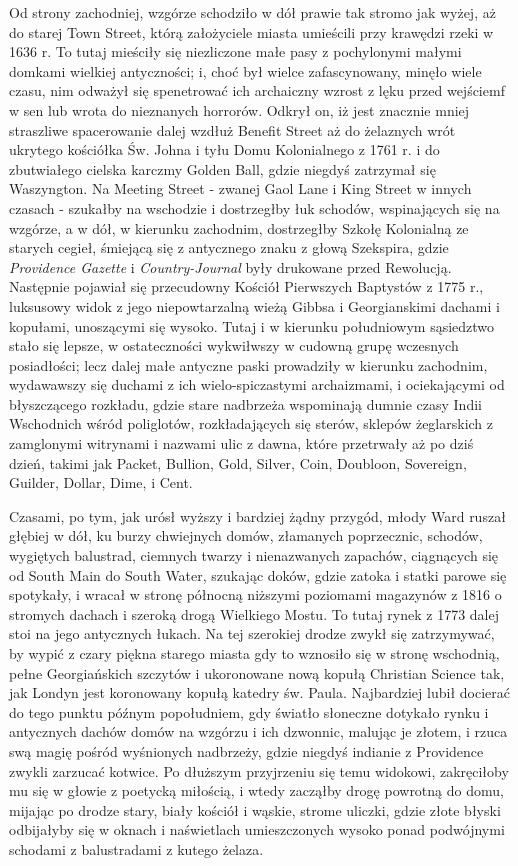 Od strony zachodniej, wzgórze schodziło w dół prawie tak stromo jak wyżej, aż do starej Town Street, którą założyciele miasta umieścili przy krawędzi rzeki w 1636 r. To tutaj mieściły się niezliczone małe pasy z pochylonymi małymi domkami wielkiej antyczności; i, choć był wielce zafascynowany, minęło wiele czasu, nim odważył się spenetrować ich archaiczny wzrost z lęku przed wejściemf w sen lub wrota do nieznanych horrorów. Odkrył on, iż jest znacznie mniej straszliwe spacerowanie dalej wzdłuż Benefit Street aż do żelaznych wrót ukrytego kościółka Św. Johna i tyłu Domu Kolonialnego z 1761 r. i do zbutwiałego cielska karczmy Golden Ball, gdzie niegdyś zatrzymał się Waszyngton. Na Meeting Street  - zwanej Gaol Lane i King Street w innych czasach - szukałby na wschodzie i dostrzegłby łuk schodów, wspinających się na wzgórze, a w dół, w kierunku zachodnim, dostrzegłby Szkołę Kolonialną ze starych cegieł,  śmiejącą się z antycznego znaku z głową Szekspira, gdzie \textit{Providence Gazette} i \textit{Country-Journal} były drukowane przed Rewolucją. Następnie pojawiał się przecudowny Kościół Pierwszych Baptystów z 1775 r., luksusowy widok z jego niepowtarzalną wieżą Gibbsa i Georgianskimi dachami i kopułami, unoszącymi się wysoko. Tutaj i w kierunku południowym sąsiedztwo stało się lepsze, w ostateczności wykwiłwszy w cudowną grupę wczesnych posiadłości; lecz dalej małe antyczne paski prowadziły w kierunku zachodnim, wydawawszy się duchami z ich wielo-spiczastymi archaizmami, i ociekającymi od błyszczącego rozkładu, gdzie stare nadbrzeża wspominają dumnie czasy Indii Wschodnich wśród poliglotów, rozkładających się sterów, sklepów żeglarskich z zamglonymi witrynami i nazwami ulic z dawna, które przetrwały aż po dziś dzień, takimi jak Packet, Bullion, Gold, Silver, Coin, Doubloon, Sovereign, Guilder, Dollar, Dime, i Cent.

Czasami, po tym, jak urósł wyższy i bardziej żądny przygód, młody Ward ruszał głębiej w dół, ku burzy chwiejnych domów, złamanych poprzecznic, schodów, wygiętych balustrad, ciemnych twarzy i nienazwanych zapachów, ciągnących się od South Main do South Water, szukając doków, gdzie zatoka i statki parowe się spotykały, i wracał w stronę północną niższymi poziomami magazynów z 1816 o stromych dachach i szeroką drogą Wielkiego Mostu. To tutaj rynek z 1773 dalej stoi na jego antycznych łukach. Na tej szerokiej drodze zwykł się zatrzymywać, by wypić z czary piękna starego miasta gdy to wznosiło się w stronę wschodnią, pełne Georgiańskich szczytów i ukoronowane nową kopułą Christian Science tak, jak Londyn jest koronowany kopułą katedry św. Paula. Najbardziej lubił docierać do tego punktu późnym popołudniem, gdy światło słoneczne dotykało rynku i antycznych dachów domów na wzgórzu i ich dzwonnic, malując je złotem, i rzuca swą magię pośród wyśnionych nadbrzeży, gdzie niegdyś indianie z Providence zwykli zarzucać kotwice. Po dłuższym przyjrzeniu się temu widokowi, zakręciłoby mu się w głowie z poetycką miłością, i wtedy zacząłby drogę powrotną do domu, mijając po drodze stary, biały kościół i wąskie, strome uliczki, gdzie złote błyski odbijałyby się w oknach i naświetlach umieszczonych wysoko ponad podwójnymi schodami z balustradami z kutego żelaza. 

